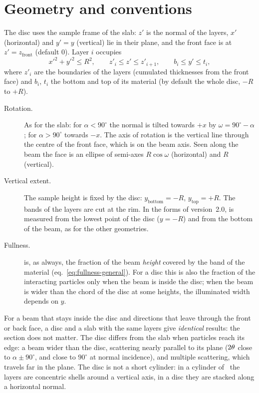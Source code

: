 \section{Geometry and conventions}

The disc uses the sample frame of the slab: $z'$ is the normal of the layers, $x'$ (horizontal) and $y'=y$ (vertical) lie in their
plane, and the front face is at $z'=z_\mathrm{front}$ (default 0). Layer $i$ occupies
\begin{equation}
  x'^2 + y'^2 \le R^2, \qquad z'_i \le z' \le z'_{i+1}, \qquad b_i \le y' \le t_i,
  \label{eq:disc-layer}
\end{equation}
where $z'_i$ are the boundaries of the layers (cumulated thicknesses from the front face) and $b_i$, $t_i$ the bottom and top of
its material (by default the whole disc, $-R$ to $+R$).

\begin{description}
  \item[Rotation.] As for the slab: for $\alpha<90^\circ$ the normal is tilted towards $+x$ by $\omega=90^\circ-\alpha$; for
        $\alpha>90^\circ$ towards $-x$. The axis of rotation is the vertical line through the centre of the front face, which is on the
        beam axis. Seen along the beam the face is an ellipse of semi-axes $R\cos\omega$ (horizontal) and $R$ (vertical).
  \item[Vertical extent.] The sample height is fixed by the disc: $y_\mathrm{bottom}=-R$, $y_\mathrm{top}=+R$. The bands of the layers
        are cut at the rim. In the forms of version~2.0,  is measured from the lowest point of the disc ($y=-R$) and
         from the bottom of the beam, as for the other geometries.
  \item[Fullness.]  is, as always, the fraction of the beam \emph{height} covered by the band of the material
        (eq.~\ref{eq:fullness-general}). For a disc this is also the fraction of the interacting particles only when the beam is
        inside the disc; when the beam is wider than the chord of the disc at some heights, the illuminated width depends on $y$.
\end{description}

\begin{note}
For a beam that stays inside the disc and directions that leave through the front or back face, a disc and a slab with the
same layers give \emph{identical} results: the section does not matter. The disc differs from the slab when particles reach its
edge: a beam wider than the disc, scattering nearly parallel to its plane ($2\theta$ close to $\alpha \pm 90^\circ$, and close to
$90^\circ$ at normal incidence), and multiple scattering, which travels far in the plane. The disc is not a short cylinder: in a
cylinder of \mcams\ the layers are concentric shells around a vertical axis, in a disc they are stacked along a horizontal normal.
\end{note}

